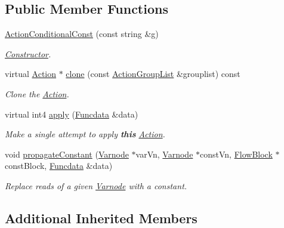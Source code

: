 \subsection*{Public Member Functions}
\begin{DoxyCompactItemize}
\item 
\mbox{\hyperlink{class_action_conditional_const_add4260c0f90c2baaf341c1e48195dd53}{Action\+Conditional\+Const}} (const string \&g)
\begin{DoxyCompactList}\small\item\em \mbox{\hyperlink{class_constructor}{Constructor}}. \end{DoxyCompactList}\item 
virtual \mbox{\hyperlink{class_action}{Action}} $\ast$ \mbox{\hyperlink{class_action_conditional_const_a5ff6a3cc3aa54f9a8a276c9e8090010f}{clone}} (const \mbox{\hyperlink{class_action_group_list}{Action\+Group\+List}} \&grouplist) const
\begin{DoxyCompactList}\small\item\em Clone the \mbox{\hyperlink{class_action}{Action}}. \end{DoxyCompactList}\item 
virtual int4 \mbox{\hyperlink{class_action_conditional_const_a36547a8bf4913bf94efa661b7f39e461}{apply}} (\mbox{\hyperlink{class_funcdata}{Funcdata}} \&data)
\begin{DoxyCompactList}\small\item\em Make a single attempt to apply {\bfseries{this}} \mbox{\hyperlink{class_action}{Action}}. \end{DoxyCompactList}\item 
void \mbox{\hyperlink{class_action_conditional_const_ab477e0173dc6a85b8a7aeee5c0c41bfc}{propagate\+Constant}} (\mbox{\hyperlink{class_varnode}{Varnode}} $\ast$var\+Vn, \mbox{\hyperlink{class_varnode}{Varnode}} $\ast$const\+Vn, \mbox{\hyperlink{class_flow_block}{Flow\+Block}} $\ast$const\+Block, \mbox{\hyperlink{class_funcdata}{Funcdata}} \&data)
\begin{DoxyCompactList}\small\item\em Replace reads of a given \mbox{\hyperlink{class_varnode}{Varnode}} with a constant. \end{DoxyCompactList}\end{DoxyCompactItemize}
\subsection*{Additional Inherited Members}


